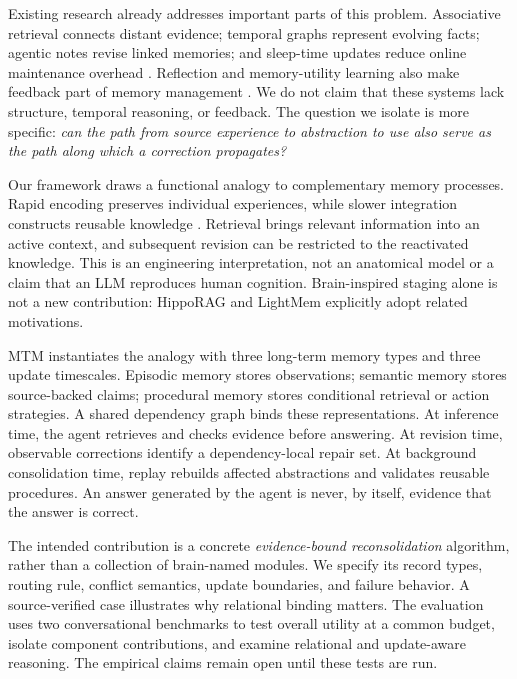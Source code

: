 \documentclass{article}
\newcommand{\method}{MTM}
\begin{document}
Existing research already addresses important parts of this problem. Associative
retrieval connects distant evidence; temporal graphs represent evolving facts;
agentic notes revise linked memories; and sleep-time updates reduce online
maintenance overhead \citep{mrw_hipporag,mrw_zep,mrw_amem,mrw_lightmem}.
Reflection and memory-utility learning also make feedback part of memory
management \citep{mrw_reflexion,mrw_hindsight,mrw_memrl}. We do not claim that
these systems lack structure, temporal reasoning, or feedback. The question
we isolate is more specific: \emph{can the path from source experience to
abstraction to use also serve as the path along which a correction propagates?}

Our framework draws a functional analogy to complementary memory processes.
Rapid encoding preserves individual experiences, while slower integration
constructs reusable knowledge \citep{brain_cls1995,brain_cls2016}. Retrieval
brings relevant information into an active context, and subsequent revision
can be restricted to the reactivated knowledge. This is an engineering
interpretation, not an anatomical model or a claim that an LLM reproduces human
cognition. Brain-inspired staging alone is not a new contribution: HippoRAG
and LightMem explicitly adopt related motivations.

\method{} instantiates the analogy with three long-term memory types and
three update timescales. Episodic memory stores observations; semantic memory
stores source-backed claims; procedural memory stores conditional retrieval
or action strategies. A shared dependency graph binds these representations.
At inference time, the agent retrieves and checks evidence before answering.
At revision time, observable corrections identify a dependency-local repair
set. At background consolidation time, replay rebuilds affected abstractions
and validates reusable procedures. An answer generated by the agent is never,
by itself, evidence that the answer is correct.

The intended contribution is a concrete \emph{evidence-bound reconsolidation}
algorithm, rather than a collection of brain-named modules. We specify its
record types, routing rule, conflict semantics, update boundaries, and failure
behavior. A source-verified case illustrates why relational binding matters.
The evaluation uses two conversational benchmarks to test overall utility at
a common budget, isolate component contributions, and examine relational and
update-aware reasoning. The empirical claims remain open until these tests
are run.
\end{document}
